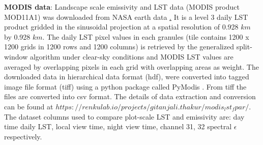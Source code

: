\documentclass[fleqn,10pt]{wlscirep}
\begin{document}
\textbf{MODIS data}:
Landscape scale emissivity and LST data (MODIS product MOD11A1) was downloaded from NASA earth data \href{https://lpdaac.usgs.gov/}. It is a level 3 daily LST product gridded in the sinusoidal projection at a spatial resolution of 0.928 $km$ by 0.928 $km$. The daily LST pixel values in each granules (tile contains 1200 x 1200 grids in 1200 rows and 1200 columns) is retrieved by the generalized split-window algorithm under clear-sky conditions and MODIS LST values are averaged by overlapping pixels in each grid with overlapping areas as weight\cite{wan2007collection}. The downloaded data in hierarchical data format (hdf), were converted into tagged image file format (tiff) using a python package called PyModis \cite{delucchi2014pymodis}. From tiff the files are converted into csv format. The details of data extraction and conversion can be found at $https://renkulab.io/projects/gitanjali.thakur/modis_lst_fpar/$. The dataset columns used to compare plot-scale LST and emissivity are: day time daily LST, local view time, night view time, channel 31, 32  spectral $\epsilon$ respectively. 
 
\end{document}

